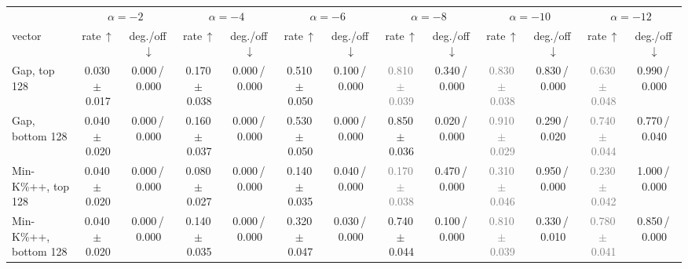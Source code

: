 \begin{tabular}{@{}lcccccccccccc@{}}
\toprule
& \multicolumn{2}{c}{$\alpha=-2$} & \multicolumn{2}{c}{$\alpha=-4$} & \multicolumn{2}{c}{$\alpha=-6$} & \multicolumn{2}{c}{$\alpha=-8$} & \multicolumn{2}{c}{$\alpha=-10$} & \multicolumn{2}{c}{$\alpha=-12$} \\
\cmidrule(lr){2-3}\cmidrule(lr){4-5}\cmidrule(lr){6-7}\cmidrule(lr){8-9}\cmidrule(lr){10-11}\cmidrule(lr){12-13}
vector & rate\,$\uparrow$ & deg./off\,$\downarrow$ & rate\,$\uparrow$ & deg./off\,$\downarrow$ & rate\,$\uparrow$ & deg./off\,$\downarrow$ & rate\,$\uparrow$ & deg./off\,$\downarrow$ & rate\,$\uparrow$ & deg./off\,$\downarrow$ & rate\,$\uparrow$ & deg./off\,$\downarrow$ \\
\midrule
Gap, top 128 & 0.030\,{\scriptsize$\pm$\,0.017} & {\scriptsize 0.000\,/\,0.000} & 0.170\,{\scriptsize$\pm$\,0.038} & {\scriptsize 0.000\,/\,0.000} & 0.510\,{\scriptsize$\pm$\,0.050} & {\scriptsize 0.100\,/\,0.000} & \textcolor{gray}{0.810\,{\scriptsize$\pm$\,0.039}} & {\scriptsize 0.340\,/\,0.000} & \textcolor{gray}{0.830\,{\scriptsize$\pm$\,0.038}} & {\scriptsize 0.830\,/\,0.000} & \textcolor{gray}{0.630\,{\scriptsize$\pm$\,0.048}} & {\scriptsize 0.990\,/\,0.000} \\
Gap, bottom 128 & 0.040\,{\scriptsize$\pm$\,0.020} & {\scriptsize 0.000\,/\,0.000} & 0.160\,{\scriptsize$\pm$\,0.037} & {\scriptsize 0.000\,/\,0.000} & 0.530\,{\scriptsize$\pm$\,0.050} & {\scriptsize 0.000\,/\,0.000} & 0.850\,{\scriptsize$\pm$\,0.036} & {\scriptsize 0.020\,/\,0.000} & \textcolor{gray}{0.910\,{\scriptsize$\pm$\,0.029}} & {\scriptsize 0.290\,/\,0.020} & \textcolor{gray}{0.740\,{\scriptsize$\pm$\,0.044}} & {\scriptsize 0.770\,/\,0.040} \\
Min-K\%++, top 128 & 0.040\,{\scriptsize$\pm$\,0.020} & {\scriptsize 0.000\,/\,0.000} & 0.080\,{\scriptsize$\pm$\,0.027} & {\scriptsize 0.000\,/\,0.000} & 0.140\,{\scriptsize$\pm$\,0.035} & {\scriptsize 0.040\,/\,0.000} & \textcolor{gray}{0.170\,{\scriptsize$\pm$\,0.038}} & {\scriptsize 0.470\,/\,0.000} & \textcolor{gray}{0.310\,{\scriptsize$\pm$\,0.046}} & {\scriptsize 0.950\,/\,0.000} & \textcolor{gray}{0.230\,{\scriptsize$\pm$\,0.042}} & {\scriptsize 1.000\,/\,0.000} \\
Min-K\%++, bottom 128 & 0.040\,{\scriptsize$\pm$\,0.020} & {\scriptsize 0.000\,/\,0.000} & 0.140\,{\scriptsize$\pm$\,0.035} & {\scriptsize 0.000\,/\,0.000} & 0.320\,{\scriptsize$\pm$\,0.047} & {\scriptsize 0.030\,/\,0.000} & 0.740\,{\scriptsize$\pm$\,0.044} & {\scriptsize 0.100\,/\,0.000} & \textcolor{gray}{0.810\,{\scriptsize$\pm$\,0.039}} & {\scriptsize 0.330\,/\,0.010} & \textcolor{gray}{0.780\,{\scriptsize$\pm$\,0.041}} & {\scriptsize 0.850\,/\,0.000} \\

\end{tabular}
